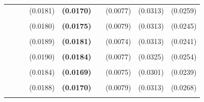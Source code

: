 \documentclass[
  12pt,
]{article}
\begin{document}
\begin{table}[H]
{\begin{tabular}[t]{llll>{}lllll}
 &  &  & (0.0181) & \textbf{(0.0170)} &  & (0.0077) & (0.0313) & (0.0259)\\
\addlinespace
\cellcolor{gray!6}{c.hamilton13.panelr15} & \cellcolor{gray!6}{-126.2968} & \cellcolor{gray!6}{-132.6796} & \cellcolor{gray!6}{0.6924} & \textbf{\cellcolor{gray!6}{0.6311}} & \cellcolor{gray!6}{6.5289} & \cellcolor{gray!6}{0.4297} & \cellcolor{gray!6}{0.2830} & \cellcolor{gray!6}{0.2647}\\
 &  &  & (0.0180) & \textbf{(0.0175)} &  & (0.0079) & (0.0313) & (0.0245)\\
\addlinespace
\cellcolor{gray!6}{c.hamilton28.panelr20} & \cellcolor{gray!6}{-164.6015} & \cellcolor{gray!6}{-170.9842} & \cellcolor{gray!6}{0.7158} & \textbf{\cellcolor{gray!6}{0.6302}} & \cellcolor{gray!6}{10.8558} & \cellcolor{gray!6}{0.3948} & \cellcolor{gray!6}{0.2925} & \cellcolor{gray!6}{0.2414}\\
 &  &  & (0.0189) & \textbf{(0.0181)} &  & (0.0074) & (0.0313) & (0.0241)\\
\addlinespace
\cellcolor{gray!6}{c.hamilton28.panelr15} & \cellcolor{gray!6}{-154.4533} & \cellcolor{gray!6}{-160.8361} & \cellcolor{gray!6}{0.7091} & \textbf{\cellcolor{gray!6}{0.6270}} & \cellcolor{gray!6}{11.5510} & \cellcolor{gray!6}{0.3854} & \cellcolor{gray!6}{0.2972} & \cellcolor{gray!6}{0.2369}\\
 &  &  & (0.0190) & \textbf{(0.0184)} &  & (0.0077) & (0.0325) & (0.0254)\\
\addlinespace
\cellcolor{gray!6}{c.hamilton13.panel} & \cellcolor{gray!6}{-133.9347} & \cellcolor{gray!6}{-140.3175} & \cellcolor{gray!6}{0.6922} & \textbf{\cellcolor{gray!6}{0.6250}} & \cellcolor{gray!6}{4.9769} & \cellcolor{gray!6}{0.4285} & \cellcolor{gray!6}{0.2877} & \cellcolor{gray!6}{0.2664}\\
 &  &  & (0.0184) & \textbf{(0.0169)} &  & (0.0075) & (0.0301) & (0.0239)\\
\addlinespace
\cellcolor{gray!6}{c.bn2.r20} & \cellcolor{gray!6}{-109.3128} & \cellcolor{gray!6}{-115.6955} & \cellcolor{gray!6}{0.6963} & \textbf{\cellcolor{gray!6}{0.6218}} & \cellcolor{gray!6}{0.2776} & \cellcolor{gray!6}{0.4080} & \cellcolor{gray!6}{0.3255} & \cellcolor{gray!6}{0.2724}\\
 &  &  & (0.0188) & \textbf{(0.0170)} &  & (0.0079) & (0.0313) & (0.0268)\\
\addlinespace
\cellcolor{gray!6}{c.linear} & \cellcolor{gray!6}{-135.4069} & \cellcolor{gray!6}{-141.7896} & \cellcolor{gray!6}{0.6879} & \textbf{\cellcolor{gray!6}{0.6204}} & \cellcolor{gray!6}{3.9989} & \cellcolor{gray!6}{0.4616} & \cellcolor{gray!6}{0.2925} & \cellcolor{gray!6}{0.2986}\\

\end{tabular}}
\end{table}
\end{document}
